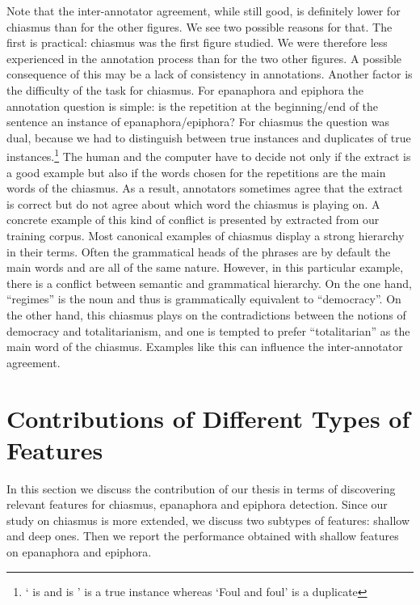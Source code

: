 Note that the inter-annotator agreement, while still good, is definitely lower for chiasmus than for the other figures. We see two possible reasons for that. The first is practical: chiasmus was the first figure studied. We were therefore less experienced in the annotation process than for the two other figures. A possible consequence of this may be a lack of consistency in annotations. Another factor is the difficulty of the task for chiasmus. For epanaphora and epiphora the annotation question is simple: is the repetition at the beginning/end of the sentence an instance of epanaphora/epiphora? For chiasmus the question was dual, because we had to distinguish between true instances and duplicates of true instances.\footnote{` is  and  is ' is a true instance whereas `Foul   and   foul' is a duplicate} The human and the computer have to decide not only if the extract is a good example but also if the words chosen for the repetitions are the main words of the chiasmus. As a result, annotators sometimes agree that the extract is correct but do not agree about which word the chiasmus is playing on. A concrete example of this kind of conflict is presented by  extracted from our training corpus.
%
%
%
Most canonical examples of chiasmus display a strong hierarchy in their terms. Often the grammatical heads of the phrases are by default the main words and are all of the same nature. However, in this particular example, there is a conflict between semantic and grammatical hierarchy. On the one hand, ``regimes'' is the noun and thus is grammatically equivalent to ``democracy''. On the other hand, this chiasmus plays on the contradictions between the notions of democracy and totalitarianism, and one is tempted to prefer ``totalitarian'' as the main word of the chiasmus. Examples like this can influence the inter-annotator agreement.
\section{Contributions of Different Types of Features}
In this section we discuss the contribution of our thesis in terms of discovering relevant features for chiasmus, epanaphora and epiphora detection. Since our study on chiasmus is more extended, we discuss two subtypes of features: shallow and deep ones. Then we report the performance obtained with shallow features on epanaphora and epiphora.
